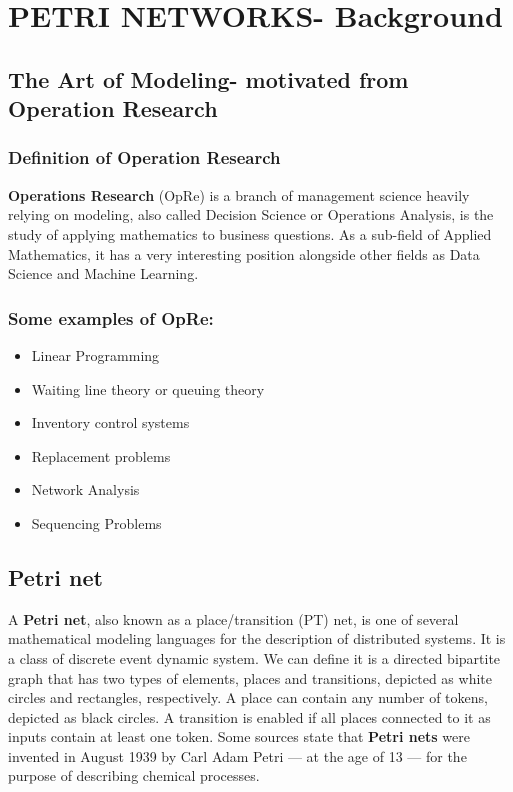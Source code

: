 \documentclass[a4paper]{article}
\begin{document}
\vspace{1 cm}

\section{PETRI NETWORKS- Background}
\subsection{The Art of Modeling- motivated from Operation Research}
\subsubsection{Definition of Operation Research}
\textbf{Operations Research} (OpRe) is a branch of management science heavily relying on modeling, also called Decision Science or Operations Analysis, is the study of applying mathematics to business questions. As a sub-field of Applied Mathematics, it has a very interesting position alongside other fields as Data Science and Machine Learning.
\subsubsection{Some examples of OpRe:}
\begin{itemize}
    \item Linear Programming
    \item Waiting line theory or queuing theory
    \item Inventory control systems
    \item Replacement problems
    \item Network Analysis
    \item Sequencing Problems
\end{itemize}
\subsection{Petri net}
A \textbf{Petri net}, also known as a place/transition (PT) net, is one of several mathematical modeling languages for the description of distributed systems. It is a class of discrete event dynamic system.\newline
We can define it is a directed bipartite graph that has two types of elements, places and transitions, depicted as white circles and rectangles, respectively. A place can contain any number of tokens, depicted as black circles. A transition is enabled if all places connected to it as inputs contain at least one token.\newline
Some sources state that \textbf{Petri nets} were invented in August 1939 by Carl Adam Petri — at the age of 13 — for the purpose of describing chemical processes.
\end{document}
